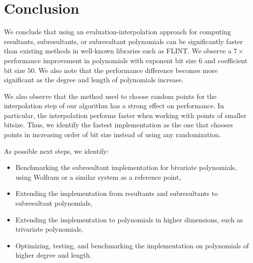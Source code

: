 \section{Conclusion}

We conclude that using an evaluation-interpolation approach for computing resultants, subresultants, or subresultant polynomials can be significantly faster than existing methods in well-known libraries such as FLINT. We observe a $7\times$ performance improvement in polynomials with exponent bit size $6$ and coefficient bit size $50$. We also note that the performance difference becomes more significant as the degree and length of polynomials increase.

We also observe that the method used to choose random points for the interpolation step of our algorithm has a strong effect on performance. In particular, the interpolation performs faster when working with points of smaller bitsize. Thus, we identify the fastest implementation as the one that chooses points in increasing order of bit size instead of using any randomization.

As possible next steps, we identify:
\begin{itemize}
  \item Benchmarking the subresultant implementation for bivariate polynomials, using Wolfram or a similar system as a reference point,
  \item Extending the implementation from resultants and subresultants to subresultant polynomials,
  \item Extending the implementation to polynomials in higher dimensions, such as trivariate polynomials,
  \item Optimizing, testing, and benchmarking the implementation on polynomials of higher degree and length.
\end{itemize}
